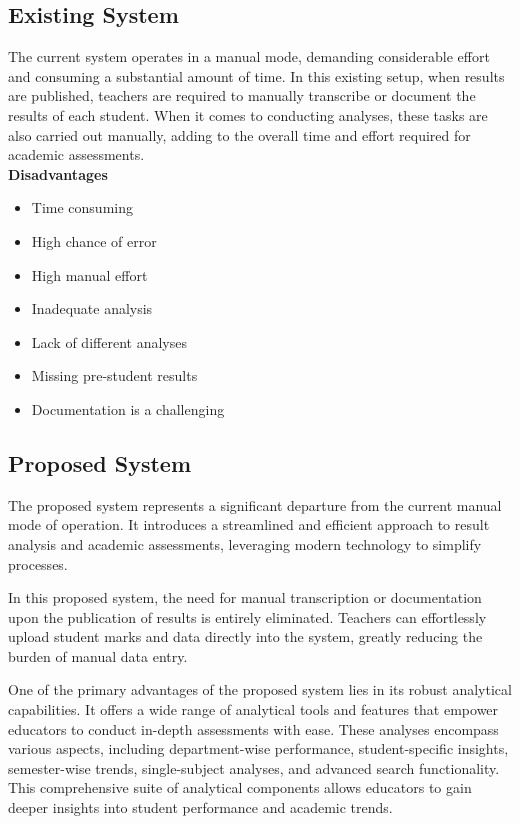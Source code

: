\documentclass{nascproject}
\begin{document}
\subsection{Existing System}
The current system operates in a manual mode, demanding considerable effort and consuming a substantial amount of time. In this existing setup, when results are published, teachers are required to manually transcribe or document the results of each student. When it comes to conducting analyses, these tasks are also carried out manually, adding to the overall time and effort required for academic assessments.\\

\textbf{Disadvantages}
\begin{itemize}
	\item Time consuming
	\item High chance of error
	\item High manual effort
	\item Inadequate analysis
	\item Lack of different analyses
	\item Missing pre-student results
	\item Documentation is a challenging
\end{itemize}
\subsection{Proposed System}
The proposed system represents a significant departure from the current manual mode of operation. It introduces a streamlined and efficient approach to result analysis and academic assessments, leveraging modern technology to simplify processes.

In this proposed system, the need for manual transcription or documentation upon the publication of results is entirely eliminated. Teachers can effortlessly upload student marks and data directly into the system, greatly reducing the burden of manual data entry.

One of the primary advantages of the proposed system lies in its robust analytical capabilities. It offers a wide range of analytical tools and features that empower educators to conduct in-depth assessments with ease. These analyses encompass various aspects, including department-wise performance, student-specific insights, semester-wise trends, single-subject analyses, and advanced search functionality. This comprehensive suite of analytical components allows educators to gain deeper insights into student performance and academic trends.\\
\end{document}
